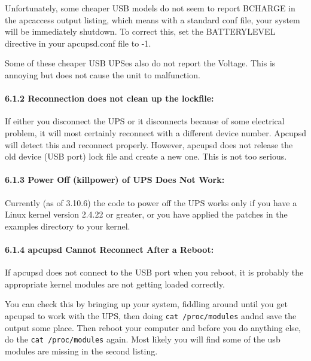 {{{{\label{index-Problems_002c-no-Battery-charge-104}
Unfortunately, some cheaper USB models do not seem to report BCHARGE in the
apcaccess output listing, which means with a standard conf file, your system
will be immediately shutdown. To correct this, set the BATTERYLEVEL directive
in your apcupsd.conf file to -1.  

Some of these cheaper USB UPSes also do not report the Voltage. This is
annoying but does not cause the unit to malfunction. 

\label{Reconnection-does-not-clean-up-the-lockfile}

\paragraph*{6.1.2 Reconnection does not clean up the lockfile:}

\label{index-Problems_002c-lock-file-not-cleaned-up-105}
If either you disconnect the UPS or it disconnects because of some electrical
problem, it will most certainly reconnect with a different device number.
Apcupsd will detect this and reconnect properly. However, apcupsd does not
release the old device (USB port) lock file and create a new one. This is not
too serious. 

\label{Power-Off-_005bkillpower_005d-of-UPS-Does-Not-Work}

\paragraph*{6.1.3 Power Off (killpower) of UPS Does Not Work:}

\label{index-Problems_002c-Power-off-106}
\label{index-Problems_002c-killpower-107}
Currently (as of 3.10.6) the code to power off the UPS works only if you have
a Linux kernel version 2.4.22 or greater, or you have applied the patches in
the examples directory to your kernel. 

\label{apcupsd-Cannot-Reconnect-After-a-Reboot}

\paragraph*{6.1.4 apcupsd Cannot Reconnect After a Reboot:}

\label{index-Problems_002c-reconnect-108}
If apcupsd does not connect to the USB port when you reboot, it is probably
the appropriate kernel modules are not getting loaded correctly.  

You can check this by bringing up your system, fiddling around until you get
apcupsd to work with the UPS, then doing {\tt cat /proc/modules} andnd save
the output some place. Then reboot your computer and before you do anything
else, do the {\tt cat /proc/modules} again. Most likely you will find some of
the usb modules are missing in the second listing.  

}}}}
